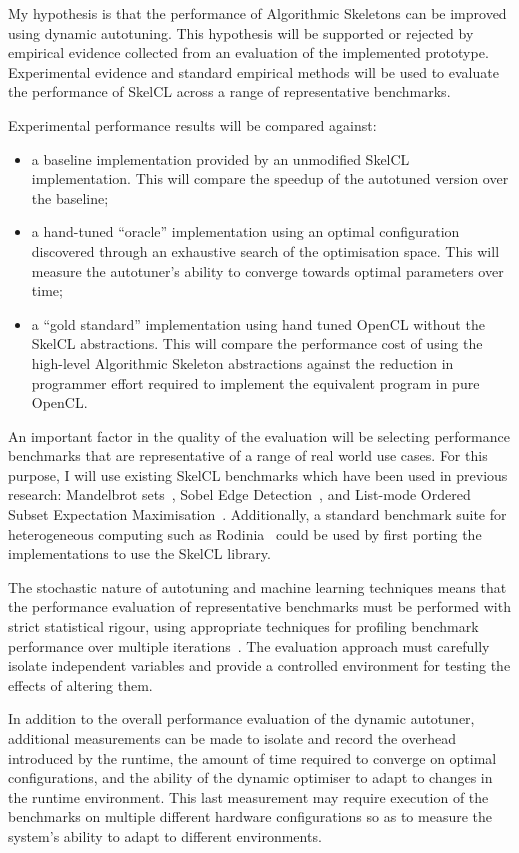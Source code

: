 My hypothesis is that the performance of Algorithmic Skeletons can be
improved using dynamic autotuning. This hypothesis will be supported
or rejected by empirical evidence collected from an evaluation of the
implemented prototype. Experimental evidence and standard empirical
methods will be used to evaluate the performance of SkelCL across a
range of representative benchmarks.

Experimental performance results will be compared against:

\begin{itemize}
\item a baseline implementation provided by an unmodified SkelCL
implementation. This will compare the speedup of the autotuned version
over the baseline;
\item a hand-tuned ``oracle'' implementation using an optimal
configuration discovered through an exhaustive search of the
optimisation space. This will measure the autotuner's ability to
converge towards optimal parameters over time;
\item a ``gold standard'' implementation using hand tuned OpenCL
without the SkelCL abstractions. This will compare the performance
cost of using the high-level Algorithmic Skeleton abstractions against
the reduction in programmer effort required to implement the
equivalent program in pure OpenCL.
\end{itemize}

An important factor in the quality of the evaluation will be selecting
performance benchmarks that are representative of a range of real
world use cases. For this purpose, I will use existing SkelCL
benchmarks which have been used in previous research: Mandelbrot
sets~\cite{Steuwer2011}, Sobel Edge Detection~\cite{Steuwer2013a}, and
List-mode Ordered Subset Expectation
Maximisation~\cite{Steuwer2013}. Additionally, a standard benchmark
suite for heterogeneous computing such as Rodinia~\cite{Che2009} could
be used by first porting the implementations to use the SkelCL
library.

The stochastic nature of autotuning and machine learning techniques
means that the performance evaluation of representative benchmarks
must be performed with strict statistical rigour, using appropriate
techniques for profiling benchmark performance over multiple
iterations~\cite{Georges2007}. The evaluation approach must carefully
isolate independent variables and provide a controlled environment for
testing the effects of altering them.

In addition to the overall performance evaluation of the dynamic
autotuner, additional measurements can be made to isolate and record
the overhead introduced by the runtime, the amount of time required to
converge on optimal configurations, and the ability of the dynamic
optimiser to adapt to changes in the runtime environment. This last
measurement may require execution of the benchmarks on multiple
different hardware configurations so as to measure the system's
ability to adapt to different environments.
